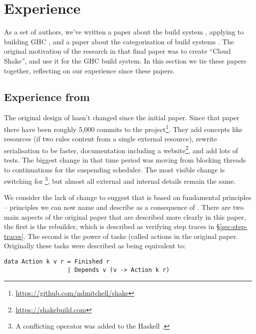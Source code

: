 \section{Experience}\label{sec-experience}

As a set of authors, we've written a paper about the \Shake build system \cite{mitchell2012shake},
applying \Shake to building GHC \cite{hadrian}, and a paper about the categorisation of build
systems \cite{mokhov2018buildsystems}. The original motivation of the research in that final paper was to create
``Cloud Shake'', and use it for the GHC build system. In this section we tie these papers together,
reflecting on our experience since these papers.

\subsection{Experience from \Shake}

The original design of \Shake hasn't changed since the initial paper. Since that paper there have been roughly 5,000 commits to the \Shake project\footnote{\url{https://github.com/ndmitchell/shake}}. They add concepts like resources (if two rules content from a single external resource), rewrite serialisation to be faster, documentation including a website\footnote{\url{https://shakebuild.com}}, and add lots of tests. The biggest change in that time period was moving from blocking threads to continuations for the suspending scheduler. The most visible change is switching \hs{*>} for \hs{\%>}\footnote{A conflicting \hs{*>} operator was added to the Haskell .}, but almost all external and internal details remain the same.

We consider the lack of change to suggest that \Shake is based on fundamental principles -- principles we can now name and describe as a consequence of \cite{mokhov2018buildsystems}. There are two main aspects of the original \Shake paper \cite{mitchell2012shake} that are described more clearly in this paper, the first is the rebuilder, which is described as verifying step traces in \S\ref{sec-step-traces}. The second is the power of \Shake tasks (called actions in the original paper. Originally these tasks were described as being equivalent to:

\begin{verbatim}
data Action k v r = Finished r
                  | Depends v (v -> Action k r)
\end{verbatim}

